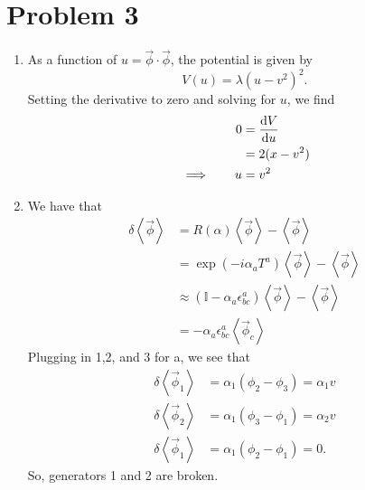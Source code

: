 \documentclass[12pt]{article}
\begin{document}
\section*{Problem 3}
\begin{enumerate}[label=(\alph*)]
    \item As a function of $u = \vec{\phi}\cdot\vec{\phi}$, the potential is given by 
    \[ V(u) = \lambda(u-v^2)^2. \]
    Setting the derivative to zero and solving for $u$, we find
    \begin{alignat*}{3}
        &\quad & 0 &= \dv{V}{u} \\
        &\quad &   &= 2(x-v^2) \\
        &\implies\quad & u &= v^2
    \end{alignat*}

    \item We have that
    \begin{align*}
        \delta\left<\vec{\phi}\right> &= R(\alpha)\left<\vec{\phi}\right> - \left<\vec{\phi}\right> \\
        &= \exp(-i\alpha_aT^a)\left<\vec{\phi}\right> - \left<\vec{\phi}\right> \\
        &\approx \left(\mathbb{I} - \alpha_a\epsilon_{bc}^a\right)\left<\vec{\phi}\right> - \left<\vec{\phi}\right> \\
        &= -\alpha_a\epsilon_{bc}^a\left<\vec{\phi}_c\right>
    \end{align*}
    Plugging in 1,2, and 3 for a, we see that
    \begin{align*}
        \delta \left<\vec{\phi}_1\right> &= \alpha_1\left(\phi_2-\phi_3\right) = \alpha_1 v \\
        \delta \left<\vec{\phi}_2\right> &= \alpha_1\left(\phi_3-\phi_1\right) = \alpha_2 v \\
        \delta \left<\vec{\phi}_1\right> &= \alpha_1\left(\phi_2-\phi_1\right) = 0.
    \end{align*}
    So, generators 1 and 2 are broken.


\end{enumerate}
\end{document}
